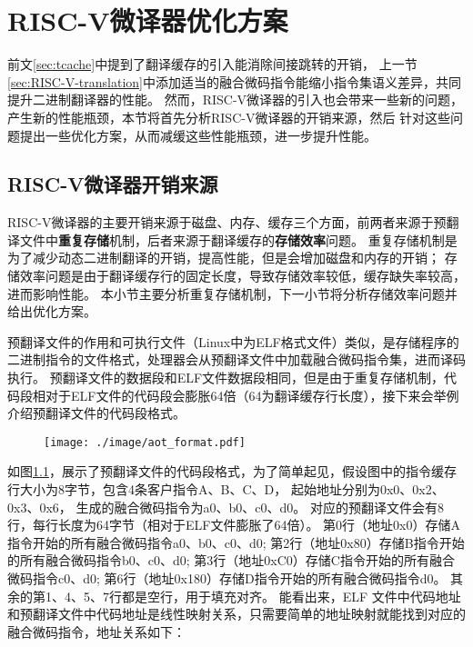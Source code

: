 \chapter{RISC-V微译器优化方案}\label{chap:Opt}

前文\ref{sec:tcache}中提到了翻译缓存的引入能消除间接跳转的开销，
上一节\ref{sec:RISC-V-translation}中添加适当的融合微码指令能缩小指令集语义差异，共同提升二进制翻译器的性能。
然而，RISC-V微译器的引入也会带来一些新的问题，产生新的性能瓶颈，本节将首先分析RISC-V微译器的开销来源，然后
针对这些问题提出一些优化方案，从而减缓这些性能瓶颈，进一步提升性能。




\section{RISC-V微译器开销来源}
RISC-V微译器的主要开销来源于磁盘、内存、缓存三个方面，前两者来源于预翻译文件中\textbf{重复存储}机制，后者来源于翻译缓存的\textbf{存储效率}问题。
重复存储机制是为了减少动态二进制翻译的开销，提高性能，但是会增加磁盘和内存的开销；
存储效率问题是由于翻译缓存行的固定长度，导致存储效率较低，缓存缺失率较高，进而影响性能。
本小节主要分析重复存储机制，下一小节将分析存储效率问题并给出优化方案。

预翻译文件的作用和可执行文件（Linux中为ELF格式文件）类似，是存储程序的二进制指令的文件格式，处理器会从预翻译文件中加载融合微码指令集，进而译码执行。
预翻译文件的数据段和ELF文件数据段相同，但是由于重复存储机制，代码段相对于ELF文件的代码段会膨胀64倍（64为翻译缓存行长度），接下来会举例介绍预翻译文件的代码段格式。

\begin{figure}[!htbp]
  \centering
  \texttt{[image: ./image/aot\_format.pdf]}
  \label{img:aot_format}
\end{figure}

如图\ref{img:aot_format}，展示了预翻译文件的代码段格式，为了简单起见，假设图中的指令缓存行大小为8字节，包含4条客户指令A、B、C、D，
起始地址分别为0x0、0x2、0x3、0x6，
生成的融合微码指令为a0、b0、c0、d0。
对应的预翻译文件会有8行，每行长度为64字节（相对于ELF文件膨胀了64倍）。
第0行（地址0x0）存储A指令开始的所有融合微码指令a0、b0、c0、d0;
第2行（地址0x80）存储B指令开始的所有融合微码指令b0、c0、d0;
第3行（地址0xC0）存储C指令开始的所有融合微码指令c0、d0;
第6行（地址0x180）存储D指令开始的所有融合微码指令d0。
其余的第1、4、5、7行都是空行，用于填充对齐。
能看出来，ELF 文件中代码地址和预翻译文件中代码地址是线性映射关系，只需要简单的地址映射就能找到对应的融合微码指令，地址关系如下：

